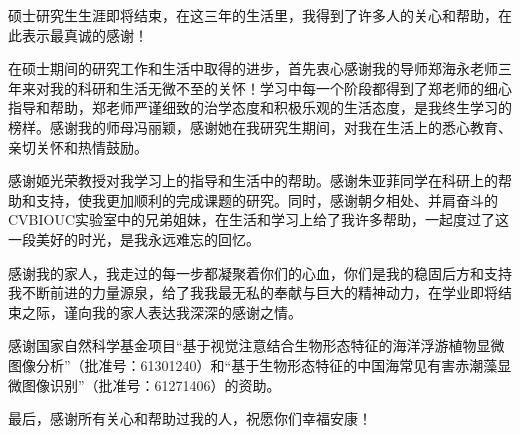 
\begin{ack}
硕士研究生生涯即将结束，在这三年的生活里，我得到了许多人的关心和帮助，在此表示最真诚的感谢！

在硕士期间的研究工作和生活中取得的进步，首先衷心感谢我的导师郑海永老师三年来对我的科研和生活无微不至的关怀！学习中每一个阶段都得到了郑老师的细心指导和帮助，郑老师严谨细致的治学态度和积极乐观的生活态度，是我终生学习的榜样。感谢我的师母冯丽颖，感谢她在我研究生期间，对我在生活上的悉心教育、亲切关怀和热情鼓励。

感谢姬光荣教授对我学习上的指导和生活中的帮助。感谢朱亚菲同学在科研上的帮助和支持，使我更加顺利的完成课题的研究。同时，感谢朝夕相处、并肩奋斗的CVBIOUC实验室中的兄弟姐妹，在生活和学习上给了我许多帮助，一起度过了这一段美好的时光，是我永远难忘的回忆。

感谢我的家人，我走过的每一步都凝聚着你们的心血，你们是我的稳固后方和支持我不断前进的力量源泉，给了我我最无私的奉献与巨大的精神动力，在学业即将结束之际，谨向我的家人表达我深深的感谢之情。

感谢国家自然科学基金项目“基于视觉注意结合生物形态特征的海洋浮游植物显微图像分析”（批准号：61301240）和“基于生物形态特征的中国海常见有害赤潮藻显微图像识别”（批准号：61271406）的资助。

最后，感谢所有关心和帮助过我的人，祝愿你们幸福安康！
\end{ack}
